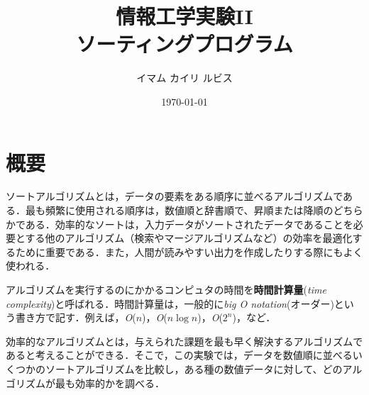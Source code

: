 \documentclass[a4j, titlepage]{jarticle}
\title{情報工学実験II\\ソーティングプログラム}
\author{イマム カイリ ルビス}
\date{\today}
\begin{document}
\maketitle

\tableofcontents
\clearpage

\section{概要}
ソートアルゴリズムとは，データの要素をある順序に並べるアルゴリズムである．最も頻繁に使用される順序は，数値順と辞書順で、昇順または降順のどちらかである．効率的なソートは，入力データがソートされたデータであることを必要とする他のアルゴリズム（検索やマージアルゴリズムなど）の効率を最適化するために重要である．また，人間が読みやすい出力を作成したりする際にもよく使われる．

アルゴリズムを実行するのにかかるコンピュタの時間を\textbf{時間計算量}(\textit{time complexity})と呼ばれる．時間計算量は，一般的に\textit{big O notation}(オーダー)という書き方で記す．例えば，\textit{O}($n$)，\textit{O}($n \log n$)，\textit{O}($2^n$)，など．


効率的なアルゴリズムとは，与えられた課題を最も早く解決するアルゴリズムであると考えることができる．そこで，この実験では，データを数値順に並べるいくつかのソートアルゴリズムを比較し，ある種の数値データに対して、どのアルゴリズムが最も効率的かを調べる．
\end{document}
